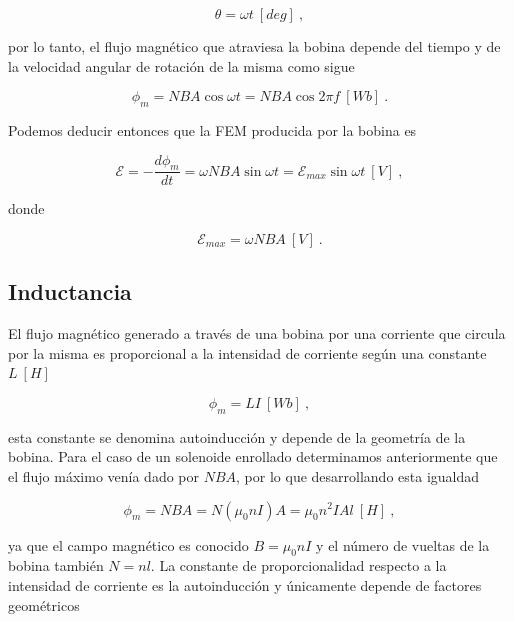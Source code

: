 \documentclass{tufte-handout}
\begin{document}
\begin{equation}
\theta = \omega t~[deg]~,
\end{equation}

por lo tanto, el flujo magnético que atraviesa la bobina depende del tiempo y de la velocidad angular de rotación de la misma como sigue

\begin{equation}
\phi_m = NBA\cos{\omega t} = NBA\cos{2\pi f}~[Wb]~.
\end{equation}

Podemos deducir entonces que la FEM producida por la bobina es 

\begin{equation}
\mathcal{E} = - \displaystyle\frac{d\phi_m}{dt} = \omega NBA\sin{\omega t} = \mathcal{E}_{max} \sin{\omega t} ~[V]~,
\end{equation}

donde

\begin{equation}
\mathcal{E}_{max} = \omega NBA~[V]~.
\end{equation}

\subsection{Inductancia}

El flujo magnético generado a través de una bobina por una corriente que circula por la misma es proporcional a la intensidad de corriente según una constante $L~[H]$ 

\begin{equation}
\phi_m = LI~[Wb]~,
\end{equation}

esta constante se denomina autoinducción y depende de la geometría de la bobina. Para el caso de un solenoide enrollado determinamos anteriormente que el flujo máximo venía dado por $NBA$, por lo que desarrollando esta igualdad

\begin{equation}
\phi_m = NBA = N(\mu_0 nI)A = \mu_0 n^2 IAl~[H]~,
\end{equation}

ya que el campo magnético es conocido $B=\mu_0 nI$ y el número de vueltas de la bobina también $N=nl$. La constante de proporcionalidad respecto a la intensidad de corriente es la autoinducción y únicamente depende de factores geométricos
\end{document}
